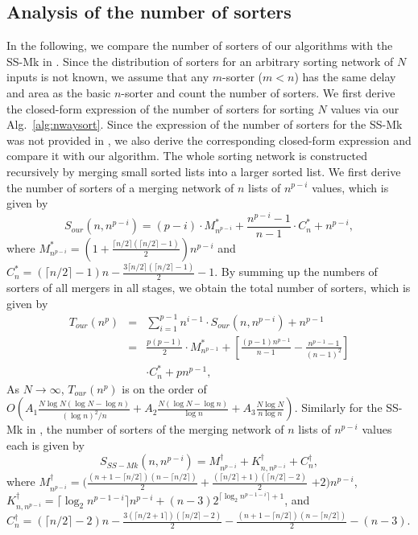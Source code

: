 \documentclass[10pt,journal,cspaper,compsoc]{IEEEtran}
\begin{document}
\subsection{Analysis of the number of sorters}
\label{sec:compsorter}
In the following, we compare the number of sorters of our algorithms with the SS-Mk in \cite{gao1997sloping}.
Since the distribution of sorters for an arbitrary sorting network of $N$ inputs is not known, we assume that any $m$-sorter ($m < n$) has the same delay and area as the basic $n$-sorter and count the number of sorters.
We first derive the closed-form expression of the number of sorters for sorting $N$ values via our Alg.~\ref{alg:nwaysort}.
Since the expression of the number of sorters for the SS-Mk was not provided in \cite{gao1997sloping}, we also derive the corresponding closed-form expression and compare it with our algorithm. The whole sorting network is constructed recursively by merging small sorted lists into a larger sorted list. We first derive the number of sorters of a merging network of $n$ lists of $n^{p-i}$ values, which is given by
\[
S_{our}(n,n^{p-i}) = (p-i)\cdot M^*_{n^{p-i}} + \frac{n^{p-i}-1}{n-1}\cdot C^*_n + n^{p-i},
\]
where $M^*_{n^{p-i}} = \left( 1+ \frac{\lceil n/2 \rceil (\lceil n/2 \rceil -1) }{2} \right)n^{p-i}$ and $C^*_n = (\lceil n/2 \rceil -1)n - \frac{3\lceil n/2 \rceil (\lceil n/2 \rceil -1)}{2} -1$.
By summing up the numbers of sorters of all mergers in all stages, we obtain the total number of sorters, which is given by
\begin{equation}
\begin{array}{rcl}
T_{our}(n^p) &=& \sum^{p-1}_{i=1} n^{i-1} \cdot S_{our}(n,n^{p-i}) + n^{p-1}\\
&=& \frac{p(p-1)}{2}\cdot M^*_{n^{p-1}} + \left[ \frac{(p-1)n^{p-1}}{n-1} - \frac{n^{p-1}-1}{(n-1)^2} \right] \\
& & \cdot C^*_n + pn^{p-1},
\end{array}
\label{eq:our_T}
\end{equation}
As $N \rightarrow \infty$, $T_{our}(n^p)$ is on the order of $O(A_1 \frac{N\log N (\log N - \log n)}{(\log n)^2 /n} + A_2 \frac{N (\log N -\log n)}{\log n} + A_3 \frac{N \log N}{n \log n})$.
Similarly for the SS-Mk in \cite{gao1997sloping}, the number of sorters of the merging network of $n$ lists of $n^{p-i}$ values each is given by
\[
S_{SS-Mk}(n,n^{p-i}) = M^\dagger_{n^{p-i}} + K^\dagger_{n,n^{p-i}} + C^\dagger_n,
\]
where $M^\dagger_{n^{p-i}} = \Big( \frac{(n+1-\lceil n/2 \rceil)(n-\lceil n/2 \rceil)}{2} + \frac{(\lceil n/2 \rceil+1)(\lceil n/2 \rceil-2)}{2}$ $ + 2 \Big)n^{p-i}$, $K^\dagger_{n,n^{p-i}} = \lceil \log_2 n^{p-1-i} \rceil n^{p-i} + (n-3)2^{\lceil \log_2 n^{p-1-i} \rceil +1}$, and $C^\dagger_n = (\lceil n/2 \rceil -2)n - \frac{3(\lceil n/2 +1 \rceil) (\lceil n/2 \rceil -2)}{2} - \frac{(n+1-\lceil n/2 \rceil)(n-\lceil n/2 \rceil)}{2} - (n-3)$.
\end{document}
